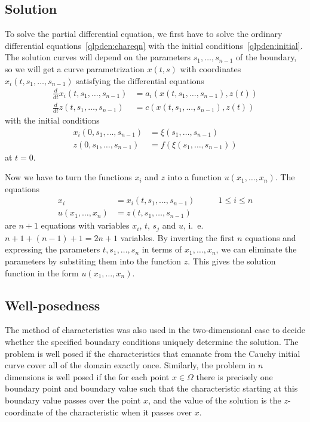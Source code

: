 \subsection{Solution}
To solve the partial differential equation, we first have to solve
the ordinary differential equations~\eqref{qlpden:chareqn} with the
initial conditions~\eqref{qlpden:initial}.
The solution curves will depend on the parameters $s_1,\dots,s_{n-1}$ 
of the boundary, so we will get a curve parametrization $x(t,s)$
with coordinates
$x_i(t,s_1,\dots,s_{n-1})$
satisfying the differential equations
\begin{align*}
\frac{d}{dt}
x_i(t,s_1,\dots,s_{n-1})
&=
a_i(x(t,s_1,\dots,s_{n-1}), z(t))
\\
\frac{d}{dt}
z(t,s_1,\dots,s_{n-1})
&=
c(x(t,s_1,\dots,s_{n-1}),z(t))
\end{align*}
with the initial conditions
\begin{align*}
x_i(0,s_1,\dots,s_{n-1})
&=
\xi(s_1,\dots,s_{n-1})
\\
z(0,s_1,\dots,s_{n-1})
&=
f(\xi(s_1,\dots,s_{n-1}))
\end{align*}
at $t=0$.

Now we have to turn the functions $x_i$ and $z$ into a function
$u(x_1,\dots,x_n)$.
The equations
\[
\begin{aligned}
x_i &= x_i(t,s_1,\dots,s_{n-1}) &\qquad 1\le i \le n
\\
  u(x_1,\dots,x_n) &= z(t,s_1,\dots,s_{n-1})
\end{aligned}
\]
are $n+1$ equations with variables $x_i$, $t$, $s_j$ and $u$,
i.~e.~$n+1+(n-1)+1=2n+1$ variables.
By inverting the first $n$ equations and expressing the parameters
$t,s_1,\dots,s_n$ in terms of $x_1,\dots,x_n$, we can eliminate the
parameters by substiting them into the function $z$.
This gives the solution function in the form $u(x_1,\dots,x_n)$.

\subsection{Well-posedness}
The method of characteristics was also used in the two-dimensional 
case to decide whether the specified boundary conditions uniquely
determine the solution.
The problem is well posed if the characteristics that emanate from
the Cauchy initial curve cover all of the domain exactly once.
Similarly, the problem in $n$ dimensions is well posed if the
for each point $x\in\Omega$ there is precisely one boundary point
and boundary value such that the characteristic starting at this
boundary value passes over the point $x$, and the value of the
solution is the $z$-coordinate of the characteristic when it passes
over $x$.

